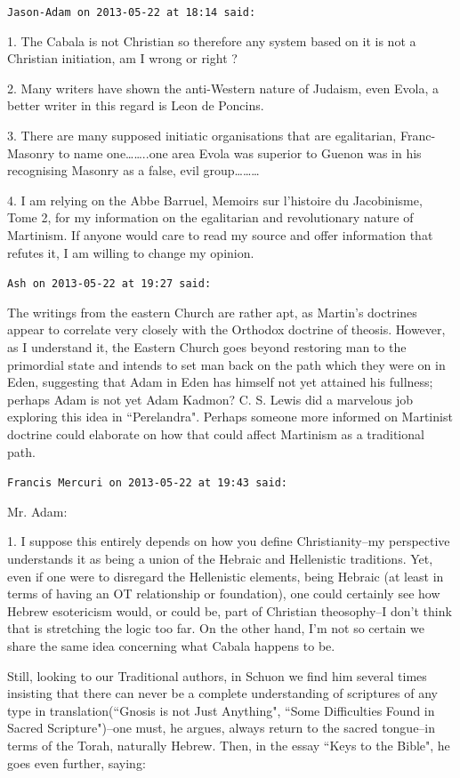 \begin{footnotesize}
\begin{sffamily}
\hfill

\texttt{Jason-Adam on 2013-05-22 at 18:14 said: }

1. The Cabala is not Christian so therefore any system based on it is not a Christian initiation, am I wrong or right ?

2. Many writers have shown the anti-Western nature of Judaism, even Evola, a better writer in this regard is Leon de Poncins. 

3. There are many supposed initiatic organisations that are egalitarian, Franc-Masonry to name one……..one area Evola was superior to Guenon was in his recognising Masonry as a false, evil group………

4. I am relying on the Abbe Barruel, Memoirs sur l'histoire du Jacobinisme, Tome 2, for my information on the egalitarian and revolutionary nature of Martinism. If anyone would care to read my source and offer information that refutes it, I am willing to change my opinion.


\hfill

\texttt{Ash on 2013-05-22 at 19:27 said: }

The writings from the eastern Church are rather apt, as Martin's doctrines appear to correlate very closely with the Orthodox doctrine of theosis. However, as I understand it, the Eastern Church goes beyond restoring man to the primordial state and intends to set man back on the path which they were on in Eden, suggesting that Adam in Eden has himself not yet attained his fullness; perhaps Adam is not yet Adam Kadmon? C. S. Lewis did a marvelous job exploring this idea in ``Perelandra". Perhaps someone more informed on Martinist doctrine could elaborate on how that could affect Martinism as a traditional path.


\hfill

\texttt{Francis Mercuri on 2013-05-22 at 19:43 said: }

Mr. Adam:

1. I suppose this entirely depends on how you define Christianity–my perspective understands it as being a union of the Hebraic and Hellenistic traditions. Yet, even if one were to disregard the Hellenistic elements, being Hebraic (at least in terms of having an OT relationship or foundation), one could certainly see how Hebrew esotericism would, or could be, part of Christian theosophy–I don't think that is stretching the logic too far. On the other hand, I'm not so certain we share the same idea concerning what Cabala happens to be.

Still, looking to our Traditional authors, in Schuon we find him several times insisting that there can never be a complete understanding of scriptures of any type in translation(``Gnosis is not Just Anything", ``Some Difficulties Found in Sacred Scripture")–one must, he argues, always return to the sacred tongue–in terms of the Torah, naturally Hebrew. Then, in the essay ``Keys to the Bible", he goes even further, saying:


\end{sffamily}
\end{footnotesize}
